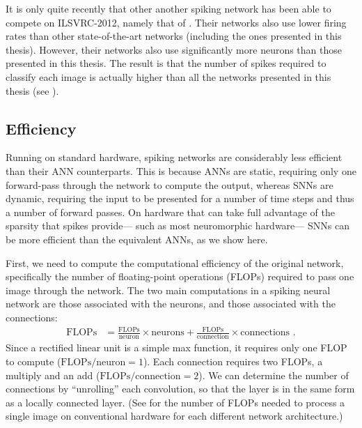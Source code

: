 It is only quite recently that other another spiking network
has been able to compete on ILSVRC-2012,
namely that of \textcite{Zambrano2017}.
Their networks also use lower firing rates than other state-of-the-art networks
(including the ones presented in this thesis).
However, their networks also use significantly more neurons
than those presented in this thesis.
The result is that the number of spikes required to classify each image
is actually higher than all the networks presented in this thesis
(see ).


\subsection{Efficiency}

\newcommand{\Esnn}{E_\text{SNN}}
\newcommand{\Esynop}{E_\text{synop}}
\newcommand{\Eupdate}{E_\text{update}}

Running on standard hardware,
spiking networks are considerably less efficient
than their ANN counterparts.
This is because ANNs are static,
requiring only one forward-pass through the network to compute the output,
whereas SNNs are dynamic,
requiring the input to be presented for a number of time steps
and thus a number of forward passes.
On hardware that can take full advantage of the sparsity that spikes provide---%
such as most neuromorphic hardware---%
SNNs can be more efficient than the equivalent ANNs, as we show here.

First, we need to compute the computational efficiency of the original network,
specifically the number of floating-point operations (FLOPs) required to pass
one image through the network.
The two main computations in a spiking neural network
are those associated with the neurons,
and those associated with the connections:
\begin{align}
  \text{FLOPs} &= \frac{\text{FLOPs}}{\text{neuron}} \times \text{neurons} +
                  \frac{\text{FLOPs}}{\text{connection}} \times \text{connections} \text{ .}
\end{align}
Since a rectified linear unit is a simple max function,
it requires only one FLOP to compute ($\text{FLOPs/neuron} = 1$).
Each connection requires two FLOPs, a multiply and an add ($\text{FLOPs/connection} = 2$).
We can determine the number of connections by ``unrolling'' each convolution,
so that the layer is in the same form as a locally connected layer.
(See  for the number of FLOPs
needed to process a single image on conventional hardware
for each different network architecture.)

